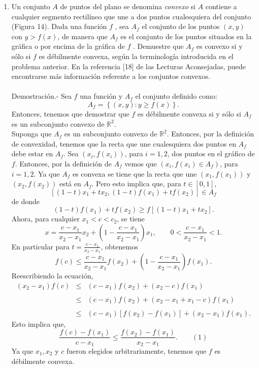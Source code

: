 \begin{enumerate}[\bfseries 1.]
    \item Un conjunto $A$ de puntos del plano se denomina \textit{convexo} si $A$ contiene a cualquier segmento rectilíneo que une a dos puntos cualesquiera del conjunto (Figura 14). Dada una función $f$ , sea $A_f$ el conjunto de los puntos $(x,y)$ con $y> f(x)$, de manera que $A_f$ es el conjunto de los puntos situados en la gráfica o por encima de la gráfica de $f$ . Demuestre que $A_f$ es convexo si y sólo si $f$ es débilmente convexa, según la terminología introducida en el problema anterior. En la referencia [18] de las Lecturas Aconsejadas, puede encontrarse más información referente a los conjuntos convexos.\\\\
	Demostración.-\; Sea $f$ una función y $A_f$ el conjunto definido como:
	$$A_f=\left\{(x,y):y\geq f(x)\right\}.$$
	Entonces, tenemos que demostrar que $f$ es débilmente convexa si y sólo si $A_f$ es un subconjunto convexo de $\mathbb{R}^2$.\\
	Suponga que $A_f$ es un subconjunto convexo de $\mathbb{R}^2$. Entonces, por la definición de convexidad, tenemos que la recta que une cualesquiera dos puntos en $A_f$ debe estar en $A_f$. Sea $(x_i,f(x_i))$, para $i=1,2$, dos puntos en el gráfico de $f$. Entonces, por la definición de $A_f$ vemos que $(x_i,f(x_i)\in A_f)$, para $i=1,2$. Ya que $A_f$ es convexa se tiene que la recta que une $(x_1,f(x_1))$ y $(x_2,f(x_2))$ está en $A_f$. Pero esto implica que, para $t\in[0,1]$,
	$$\left[(1-t)x_1+tx_2,(1-t)f(x_1)+tf(x_2)\right]\in A_f$$
	de donde
	$$(1-t)f(x_1)+tf(x_2)\geq f\left[(1-t)x_1+tx_2\right].$$
	Ahora, para cualquier $x_1<c<c_2$, se tiene
	$$x=\dfrac{c-x_1}{x_2-x_1}x_2+\left(1-\dfrac{c-x_1}{x_2-x_1}\right)x_1,\qquad 0<\dfrac{c-x_1}{x_2-x_1}<1.$$
	En particular para $t=\frac{c-x_1}{x_2-x_1}$, obtenemos
	$$f(c)\leq \dfrac{c-x_1}{x_2-x_1}f(x_2)+\left(1-\dfrac{c-x_1}{x_2-x_1}\right)f(x_1).$$
	Reescribiendo la ecuación,
	$$
	\begin{array}{rcl}
	    (x_2-x_1)f(c)&\leq& (c-x_1)f(x_2)+(x_2-c)f(x_1)\\\\
			 &\leq& (c-x_1)f(x_2)+(x_2-x_1+x_1-c)f(x_1)\\\\
			 &\leq& (c-x_1)\left[f(x_2)-f(x_1)\right]+(x_2-x_1)f(x_1).
	\end{array}
	$$
	Esto implica que,
	$$\dfrac{f(c)-f(x_1)}{c-x_1}\leq \dfrac{f(x_2)-f(x_1)}{x_2-x_1}. \qquad (1)$$
	Ya que $x_1,x_2$ y $c$ fueron elegidos arbitrariamente, tenemos que $f$ es débilmente convexa.\\


\end{enumerate}
